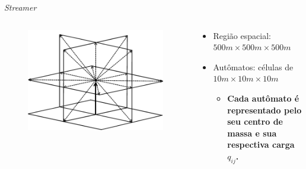 \documentclass{beamer}
\begin{document}
\begin{frame}{\textit{Streamer}}
	\begin{columns}
		\begin{column}{0.5\textwidth}
			\begin{figure}
				\includegraphics[height=0.6\textheight]{imagens_artigo/5.png}
			\end{figure}
		\end{column}
		\begin{column}{0.5\textwidth}
			\begin{itemize}
				\item Região espacial: $500m \times 500 m\times 500 m$
				\item Autômatos: células de $10m \times 10m \times 10m$
				\begin{itemize}
					\item \textbf{Cada autômato é representado pelo seu centro de massa e sua respectiva carga $q_{ij}$.}
				\end{itemize}
			\end{itemize}
		\end{column}
	\end{columns}
\end{frame}
\end{document}
